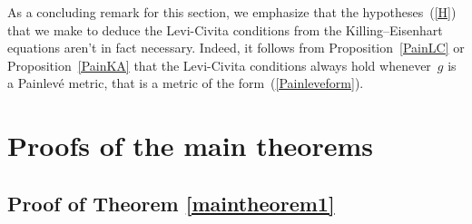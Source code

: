\documentclass[11pt]{article}
\numberwithin{equation}{section}
\begin{document}
As a concluding remark for this section, we emphasize that the hypotheses~(\ref{H}) that we make to deduce the Levi-Civita conditions from the Killing--Eisenhart equations aren't in fact necessary. Indeed, it follows from Proposition~\ref{PainLC} or Proposition~\ref{PainKA} that the Levi-Civita conditions always hold whenever~$g$ is a Painlev\'e metric, that is a metric of the form~(\ref{Painleveform}).


\setcounter{section}{5}
\setcounter{subsection}{0}
\setcounter{subsubsection}{0}
\setcounter{Theorem}{2}
\setcounter{equation}{8}
\section{Proofs of the main theorems} \label{ProofsofMainTheorems}

\subsection{Proof of Theorem \ref{maintheorem1}}
\end{document}
